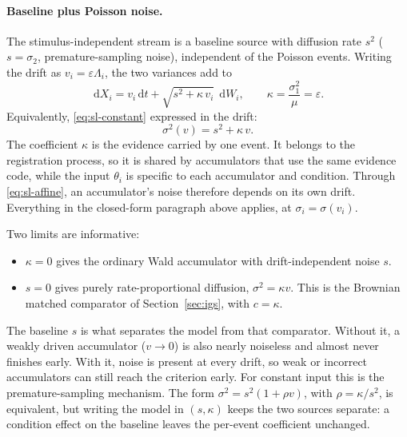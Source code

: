 \documentclass[12pt]{article}
\newcommand{\dd}{\,\mathrm{d}}
\begin{document}
\paragraph{Baseline plus Poisson noise.}
The stimulus-independent stream is a baseline source with diffusion rate $s^2$ ($s=\sigma_2$, premature-sampling noise), independent of the Poisson events. Writing the drift as $v_i=\varepsilon\Lambda_i$, the two variances add to
\begin{equation}
  \boxed{\;\dd X_i=v_i\dd t+\sqrt{s^2+\kappa\,v_i}\;\dd W_i,
  \qquad \kappa=\frac{\sigma_1^2}{\mu}=\varepsilon .\;}
  \label{eq:baseline-poisson}
\end{equation}
Equivalently, \eqref{eq:sl-constant} expressed in the drift:
\begin{equation}
  \sigma^2(v)=s^2+\kappa\,v .
  \label{eq:sl-affine}
\end{equation}
The coefficient $\kappa$ is the evidence carried by one event. It belongs to the registration process, so it is shared by accumulators that use the same evidence code, while the input $\theta_i$ is specific to each accumulator and condition. Through \eqref{eq:sl-affine}, an accumulator's noise therefore depends on its own drift. Everything in the closed-form paragraph above applies, at $\sigma_i=\sigma(v_i)$.

Two limits are informative:
\begin{itemize}
  \item $\kappa=0$ gives the ordinary Wald accumulator with drift-independent noise $s$.
  \item $s=0$ gives purely rate-proportional diffusion, $\sigma^2=\kappa v$. This is the Brownian matched comparator of Section~\ref{sec:igs}, with $c=\kappa$.
\end{itemize}
The baseline $s$ is what separates the model from that comparator. Without it, a weakly driven accumulator ($v\to0$) is also nearly noiseless and almost never finishes early. With it, noise is present at every drift, so weak or incorrect accumulators can still reach the criterion early. For constant input this is the premature-sampling mechanism. The form $\sigma^2=s^2(1+\rho v)$, with $\rho=\kappa/s^2$, is equivalent, but writing the model in $(s,\kappa)$ keeps the two sources separate: a condition effect on the baseline leaves the per-event coefficient unchanged.
\end{document}
